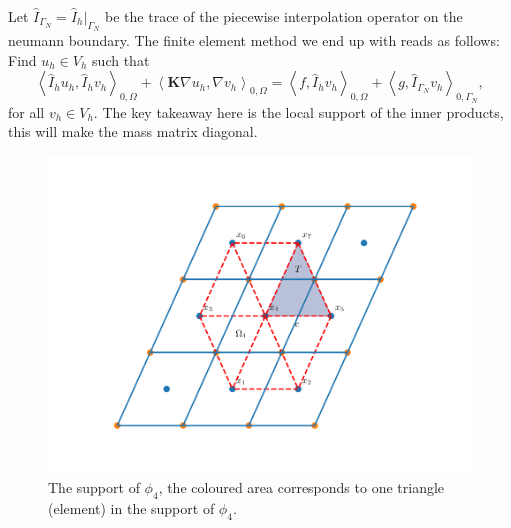 \documentclass[../Main/main.tex]{subfiles}
\begin{document}
	Let $\hat{I}_{\Gamma_N} = \hat{I}_{h}|_{\Gamma_N}$ be the trace of the piecewise interpolation operator on the neumann boundary.
	The finite element method we end up with reads as follows: Find $u_h\in V_h$ such that
	\begin{equation} \label{eq:modified_fem}
			\left \langle \hat{I}_h u_h,\hat{I}_h v_h \right \rangle_{0,\Omega} +   \left \langle\bm{K} \nabla u_h,\nabla v_h \right \rangle_{0,\Omega} = \left \langle f,\hat{I}_h v_h \right \rangle_{0,\Omega} + \left \langle g,\hat{I}_{\Gamma_N} v_h \right \rangle_{0,\Gamma_N},
	\end{equation}
	for all $v_h\in V_h$. 
	The key takeaway here is the local support of the inner products, this will make the mass matrix diagonal.   
	\par
		\begin{figure}[H]
		\centering
		\includegraphics[width=1\textwidth]{Control volume.pdf}
		\caption{The support of $\phi_4$, the coloured area corresponds to one triangle (element) in the support of $\phi_4$. }
		\label{fig:control volume}
	\end{figure}
\end{document}
